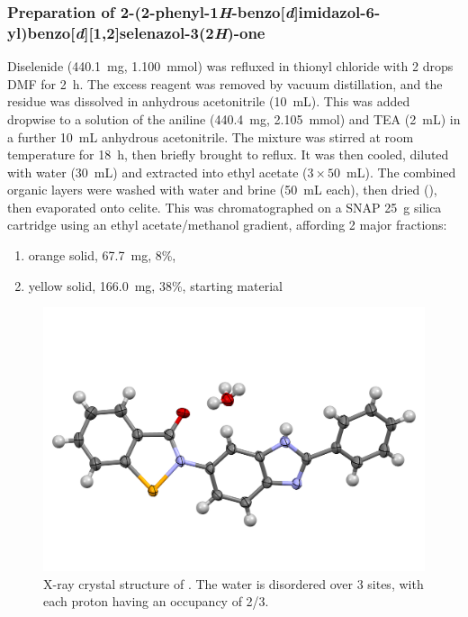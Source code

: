 \subsubsection{Preparation of 2-(2-phenyl-1\emph{H}-benzo[\emph{d}]imidazol-6-yl)benzo[\emph{d}][1,2]selenazol-3(2\emph{H})-one }
Diselenide  (440.1~mg, 1.100~mmol) was refluxed in thionyl chloride with 2 drops DMF for 2~h. 
The excess reagent was removed by vacuum distillation, and the residue was dissolved in anhydrous acetonitrile (10~mL).
This was added dropwise to a solution of the aniline  (440.4~mg, 2.105~mmol) and TEA (2~mL) in a further 10~mL anhydrous acetonitrile.
The mixture was stirred at room temperature for 18~h, then briefly brought to reflux.
It was then cooled, diluted with water (30~mL) and extracted into ethyl acetate ($3\times50$~mL).
The combined organic layers were washed with water and brine (50~mL each), then dried (), then evaporated onto celite.
This was chromatographed on a SNAP 25~g silica cartridge using an ethyl acetate/methanol gradient, affording 2 major fractions:
\begin{enumerate}
    \item orange solid, 67.7~mg, 8\%, 
    \item yellow solid, 166.0~mg, 38\%, starting material 
\end{enumerate}

\begin{figure}[h]
    \centering
    \includegraphics[width=0.8\linewidth]{Figures/ebs-rhs-xray.png}
    \caption{X-ray crystal structure of . The water is disordered over 3 sites, with each proton having an occupancy of 2/3.}
    \label{fig:ebs-rhs-xray}
\end{figure}

